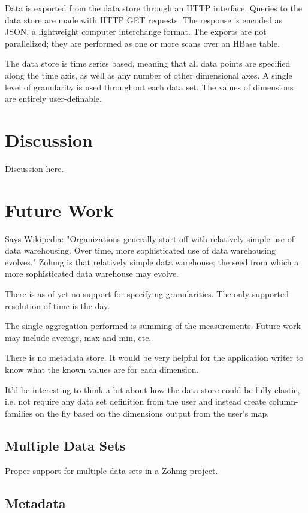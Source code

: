 Data is exported from the data store through an HTTP interface. Queries to the
data store are made with HTTP GET requests. The response is encoded as JSON, a
lightweight computer interchange format. The exports are not parallelized; they
are performed as one or more scans over an HBase table.

The data store is time series based, meaning that all data points are specified
along the time axis, as well as any number of other dimensional axes. A single
level of granularity is used throughout each data set. The values of dimensions
are entirely user-definable.


\section{Discussion}

Discussion here.


\section{Future Work}

Says Wikipedia: "Organizations generally start off with relatively simple use
of data warehousing. Over time, more sophisticated use of data warehousing
evolves." Zohmg is that relatively simple data warehouse; the seed from which
a more sophisticated data warehouse may evolve.

There is as of yet no support for specifying granularities. The only supported
resolution of time is the day.

The single aggregation performed is summing of the measurements. Future work
may include average, max and min, etc.

There is no metadata store. It would be very helpful for the application
writer to know what the known values are for each dimension.

It'd be interesting to think a bit about how the data store could be fully
elastic, i.e. not require any data set definition from the user and instead
create column-families on the fly based on the dimensions output from the
user's map.


\subsection*{Multiple Data Sets}

Proper support for multiple data sets in a Zohmg project.


\subsection*{Metadata}

